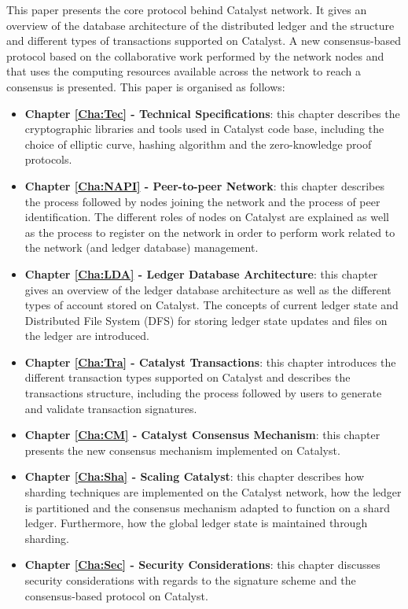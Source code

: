 This paper presents the core protocol behind Catalyst network. It gives an overview of the database architecture of the distributed ledger and the structure and different types of transactions supported on Catalyst. A new consensus-based protocol based on the collaborative work performed by the network nodes and that uses the computing resources available across the network to reach a consensus is presented. This paper is organised as follows:

\begin{itemize}
\item \textbf{Chapter \ref{Cha:Tec} - Technical Specifications}: this chapter describes the cryptographic libraries and tools used in Catalyst code base, including the choice of elliptic curve, hashing algorithm and the zero-knowledge proof protocols. 

\item \textbf{Chapter \ref{Cha:NAPI} - Peer-to-peer Network}: this chapter describes the process followed by nodes joining the network and the process of peer identification. The different roles of nodes on Catalyst are explained as well as the process to register on the network in order to perform work related to the network (and ledger database) management. 

\item \textbf{Chapter \ref{Cha:LDA} - Ledger Database Architecture}: this chapter gives an overview of the ledger database architecture as well as the different types of account stored on Catalyst. The concepts of current ledger state and Distributed File System (DFS) for storing ledger state updates and files on the ledger are introduced. 

\item \textbf{Chapter \ref{Cha:Tra} - Catalyst Transactions}: this chapter introduces the different transaction types supported on Catalyst and describes the transactions structure, including the process followed by users to generate and validate transaction signatures. 

\item \textbf{Chapter \ref{Cha:CM} - Catalyst Consensus Mechanism}: this chapter presents the new consensus mechanism implemented on Catalyst. 

\item \textbf{Chapter \ref{Cha:Sha} - Scaling Catalyst}: this chapter describes how sharding techniques are implemented on the Catalyst network, how the ledger is partitioned and the consensus mechanism adapted to function on a shard ledger. Furthermore, how the global ledger state is maintained through sharding. 


\item \textbf{Chapter \ref{Cha:Sec} - Security Considerations}: this chapter discusses security considerations with regards to the signature scheme and the consensus-based protocol on Catalyst. 

\end{itemize}